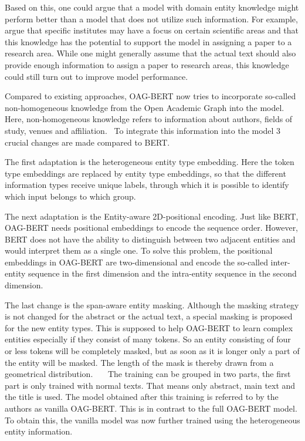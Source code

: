 	Based on this, one could argue that a model with domain entity knowledge might perform better than a model that does not utilize such information. For example, \citeauthor{Liu2021} argue that specific institutes may have a focus on certain scientific areas and that this knowledge has the potential to support the model in assigning a paper to a research area.\cite{Liu2021} While one might generally assume that the actual text should also provide enough information to assign a paper to research areas, this knowledge could still turn out to improve model performance. 
	
	Compared to existing approaches, OAG-BERT now tries to incorporate so-called non-homogeneous knowledge from the Open Academic Graph into the model. Here, non-homogeneous knowledge refers to information about authors, fields of study, venues and affiliation. 
	To integrate this information into the model 3 crucial changes are made compared to BERT. \cite{Liu2021}
	
	The first adaptation is the heterogeneous entity type embedding. Here the token type embeddings are replaced by entity type embeddings, so that the different information types receive unique labels, through which it is possible to identify which input belongs to which group. \cite{Liu2021}
	
	The next adaptation is the Entity-aware 2D-positional encoding. Just like BERT, OAG-BERT needs positional embeddings to encode the sequence order. However, BERT does not have the ability to distinguish between two adjacent entities and would interpret them as a single one. To solve this problem, the positional embeddings in OAG-BERT are two-dimensional and encode the so-called inter-entity sequence in the first dimension and the intra-entity sequence in the second dimension. \cite{Devlin2018,Liu2021}
	
	The last change is the span-aware entity masking. Although the masking strategy is not changed for the abstract or the actual text, a special masking is proposed for the new entity types. This is supposed to help OAG-BERT to learn complex entities especially if they consist of many tokens. So an entity consisting of four or less tokens will be completely masked, but as soon as it is longer only a part of the entity will be masked. The length of the mask is thereby drawn from a geometrical distribution.   
	The training can be grouped in two parts, the first part is only trained with normal texts. That means only abstract, main text and the title is used. The model obtained after this training is referred to by the authors as vanilla OAG-BERT. This is in contrast to the full OAG-BERT model. To obtain this, the vanilla model was now further trained using the heterogeneous entity information. \cite{Liu2021}
	
